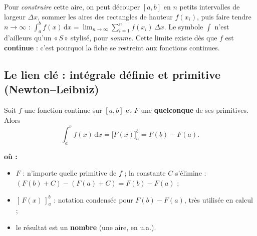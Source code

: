 \documentclass[11pt,a4paper]{article}
\newenvironment{ou}{%
  \par\smallskip\noindent\textbf{où :}\nopagebreak
  \begin{itemize}[leftmargin=1.8em,topsep=2pt,itemsep=1.5pt,parsep=0pt]}%
  {\end{itemize}}
\newcommand{\dd}{\mathrm{d}}
\begin{document}
\begin{remarque}
Pour \emph{construire} cette aire, on peut découper $[a,b]$ en $n$ petits intervalles de largeur
$\Delta x$, sommer les aires des rectangles de hauteur $f(x_i)$, puis faire tendre $n\to\infty$ :
$\displaystyle\int_a^b f(x)\,\dd x=\lim_{n\to\infty}\sum_{i=1}^n f(x_i)\,\Delta x$. Le symbole
$\int$ n'est d'ailleurs qu'un «\,$S$\,» stylisé, pour \emph{somme}. Cette limite existe dès que $f$
est \textbf{continue} : c'est pourquoi la fiche se restreint aux fonctions continues.
\end{remarque}

\begin{center}
\end{center}

\subsection{Le lien clé : intégrale définie et primitive (Newton--Leibniz)}

\begin{theoreme}
Soit $f$ une fonction continue sur $[a,b]$ et $F$ une \textbf{quelconque} de ses primitives. Alors
\[
\boxed{\;\int_a^b f(x)\,\dd x = \bigl[F(x)\bigr]_a^b = F(b)-F(a).\;}
\]
\begin{ou}
  \item $F$ : n'importe quelle primitive de $f$ ; la constante $C$ s'élimine : $(F(b)+C)-(F(a)+C)=F(b)-F(a)$ ;
  \item $[\,F(x)\,]_a^b$ : notation condensée pour $F(b)-F(a)$, très utilisée en calcul ;
  \item le résultat est un \textbf{nombre} (une aire, en u.a.).
\end{ou}
\end{theoreme}
\end{document}
